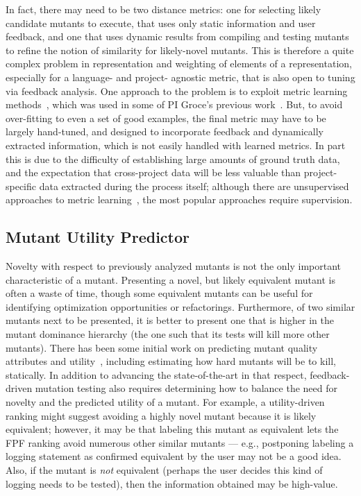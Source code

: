  In fact, there may
need to be two distance metrics:  one for selecting likely candidate
mutants to execute, that uses only static information and user
feedback, and one that uses dynamic results from compiling and testing
mutants to refine the notion of similarity for likely-novel mutants.
This is therefore a quite complex problem in representation and weighting of elements of a
representation, especially for a language- and
project- agnostic metric, that is also open to tuning via feedback
analysis.  One approach to the problem is to exploit metric learning
methods~\cite{kulis2012metric}, which was used in some of PI Groce's
previous work~\cite{SoftMining}.  But, to avoid over-fitting
to even a set of good examples, the final metric may have to be largely
hand-tuned, and designed to incorporate feedback and dynamically
extracted information, which is not easily handled with learned metrics.  In part this is due to the difficulty of establishing
large amounts of ground truth data, and the expectation that
cross-project data will be less valuable than project-specific data
extracted during the process itself; although there are unsupervised
approaches to metric
learning~\cite{scholkopf1998nonlinear,tipping1999probabilistic}, the most
popular approaches require supervision.

\subsection{Mutant Utility Predictor}

Novelty with respect to previously analyzed mutants is not the only
important characteristic of a mutant.  Presenting a novel, but likely
equivalent mutant is often a waste of time, though some equivalent
mutants can be useful for identifying optimization opportunities or
refactorings.  Furthermore, of two similar mutants next to be presented,
it is better to present one that is higher in the mutant dominance
hierarchy (the one such that its tests will kill more other mutants).
There has been some initial work on predicting mutant quality
attributes and utility~\cite{MutQuality,FaRM}, including estimating how hard mutants
will be to kill, statically.  In addition to advancing the
state-of-the-art in that respect, feedback-driven mutation testing
also requires determining how to balance the need for novelty and the
predicted utility of a mutant.  For example, a utility-driven ranking
might suggest avoiding a highly novel mutant because it is likely
equivalent; however, it may be that labeling this mutant as equivalent
lets the FPF ranking avoid numerous other similar mutants --- e.g.,
postponing labeling a logging statement as confirmed equivalent by the
user may not be a
good idea.  Also, if the mutant is \emph{not} equivalent (perhaps the
user decides this kind of logging needs to be tested), then the
information obtained may be high-value.

